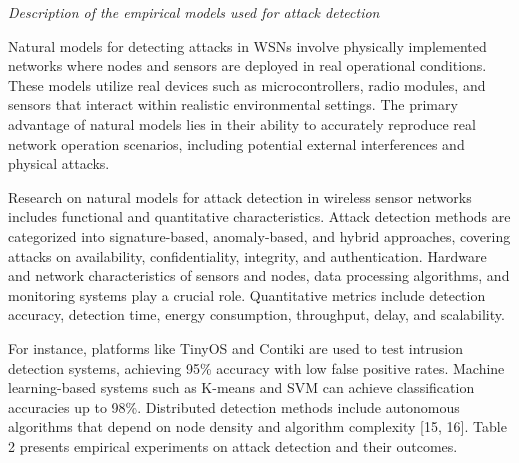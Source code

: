 \emph{Description of the empirical models used for attack detection}
\begin{multicols}{2}

Natural models for detecting attacks in WSNs involve physically
implemented networks where nodes and sensors are deployed in real
operational conditions. These models utilize real devices such as
microcontrollers, radio modules, and sensors that interact within
realistic environmental settings. The primary advantage of natural
models lies in their ability to accurately reproduce real network
operation scenarios, including potential external interferences and
physical attacks.

Research on natural models for attack detection in wireless sensor
networks includes functional and quantitative characteristics. Attack
detection methods are categorized into signature-based, anomaly-based,
and hybrid approaches, covering attacks on availability,
confidentiality, integrity, and authentication. Hardware and network
characteristics of sensors and nodes, data processing algorithms, and
monitoring systems play a crucial role. Quantitative metrics include
detection accuracy, detection time, energy consumption, throughput,
delay, and scalability.

For instance, platforms like TinyOS and Contiki are used to test
intrusion detection systems, achieving 95\% accuracy with low false
positive rates. Machine learning-based systems such as K-means and SVM
can achieve classification accuracies up to 98\%. Distributed detection
methods include autonomous algorithms that depend on node density and
algorithm complexity {[}15, 16{]}. Table 2 presents empirical
experiments on attack detection and their outcomes.
\end{multicols}


